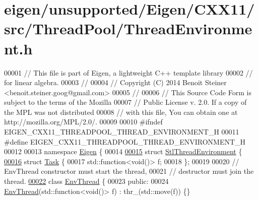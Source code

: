 \hypertarget{eigen_2unsupported_2_eigen_2_c_x_x11_2src_2_thread_pool_2_thread_environment_8h_source}{}\section{eigen/unsupported/\+Eigen/\+C\+X\+X11/src/\+Thread\+Pool/\+Thread\+Environment.h}
\label{eigen_2unsupported_2_eigen_2_c_x_x11_2src_2_thread_pool_2_thread_environment_8h_source}

\begin{DoxyCode}
00001 \textcolor{comment}{// This file is part of Eigen, a lightweight C++ template library}
00002 \textcolor{comment}{// for linear algebra.}
00003 \textcolor{comment}{//}
00004 \textcolor{comment}{// Copyright (C) 2014 Benoit Steiner <benoit.steiner.goog@gmail.com>}
00005 \textcolor{comment}{//}
00006 \textcolor{comment}{// This Source Code Form is subject to the terms of the Mozilla}
00007 \textcolor{comment}{// Public License v. 2.0. If a copy of the MPL was not distributed}
00008 \textcolor{comment}{// with this file, You can obtain one at http://mozilla.org/MPL/2.0/.}
00009 
00010 \textcolor{preprocessor}{#ifndef EIGEN\_CXX11\_THREADPOOL\_THREAD\_ENVIRONMENT\_H}
00011 \textcolor{preprocessor}{#define EIGEN\_CXX11\_THREADPOOL\_THREAD\_ENVIRONMENT\_H}
00012 
00013 \textcolor{keyword}{namespace }\hyperlink{namespace_eigen}{Eigen} \{
00014 
\hyperlink{struct_eigen_1_1_stl_thread_environment}{00015} \textcolor{keyword}{struct }\hyperlink{struct_eigen_1_1_stl_thread_environment}{StlThreadEnvironment} \{
\hyperlink{struct_eigen_1_1_stl_thread_environment_1_1_task}{00016}   \textcolor{keyword}{struct }\hyperlink{struct_eigen_1_1_stl_thread_environment_1_1_task}{Task} \{
00017     std::function<void()> f;
00018   \};
00019 
00020   \textcolor{comment}{// EnvThread constructor must start the thread,}
00021   \textcolor{comment}{// destructor must join the thread.}
\hyperlink{class_eigen_1_1_stl_thread_environment_1_1_env_thread}{00022}   \textcolor{keyword}{class }\hyperlink{class_eigen_1_1_stl_thread_environment_1_1_env_thread}{EnvThread} \{
00023    \textcolor{keyword}{public}:
00024     \hyperlink{class_eigen_1_1_stl_thread_environment_1_1_env_thread}{EnvThread}(std::function<\textcolor{keywordtype}{void}()> f) : thr\_(std::move(f)) \{\}

\end{DoxyCode}
